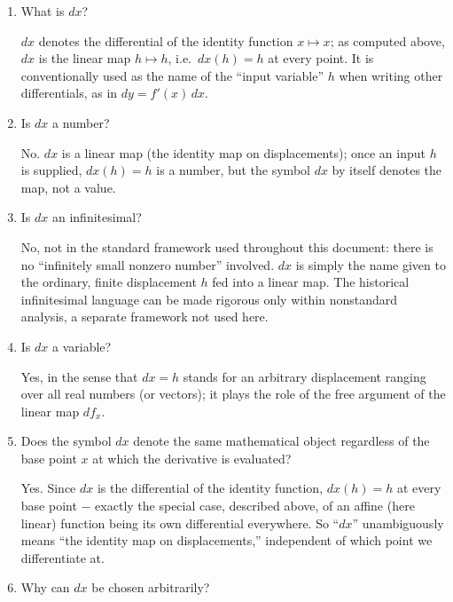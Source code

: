 \documentclass{self-check}
\begin{document}
\begin{enumerate}[resume, leftmargin=*, itemsep=8pt]
  \item What is \(dx\)?
    \begin{answer}
      \(dx\) denotes the differential of the identity function \(x\mapsto x\); as computed above, \(dx\) is the linear map \(h\mapsto h\), i.e.\ \(dx(h)=h\) at every point. It is conventionally used as the name of the ``input variable'' \(h\) when writing other differentials, as in \(dy=f'(x)\,dx\).
    \end{answer}
  \item Is \(dx\) a number?
    \begin{answer}
      No. \(dx\) is a linear map (the identity map on displacements); once an input \(h\) is supplied, \(dx(h)=h\) is a number, but the symbol \(dx\) by itself denotes the map, not a value.
    \end{answer}
  \item Is \(dx\) an infinitesimal?
    \begin{answer}
      No, not in the standard framework used throughout this document: there is no ``infinitely small nonzero number'' involved. \(dx\) is simply the name given to the ordinary, finite displacement \(h\) fed into a linear map. The historical infinitesimal language can be made rigorous only within nonstandard analysis, a separate framework not used here.
    \end{answer}
  \item Is \(dx\) a variable?
    \begin{answer}
      Yes, in the sense that \(dx=h\) stands for an arbitrary displacement ranging over all real numbers (or vectors); it plays the role of the free argument of the linear map \(df_{x}\).
    \end{answer}
  \item Does the symbol \(dx\) denote the same mathematical object regardless of the base point \(x\) at which the derivative is evaluated?
    \begin{answer}
      Yes. Since \(dx\) is the differential of the identity function, \(dx(h)=h\) at every base point \(-\) exactly the special case, described above, of an affine (here linear) function being its own differential everywhere. So ``\(dx\)'' unambiguously means ``the identity map on displacements,'' independent of which point we differentiate at.
    \end{answer}
  \item Why can \(dx\) be chosen arbitrarily?
    \begin{answer}

\end{answer}
\end{enumerate}
\end{document}
